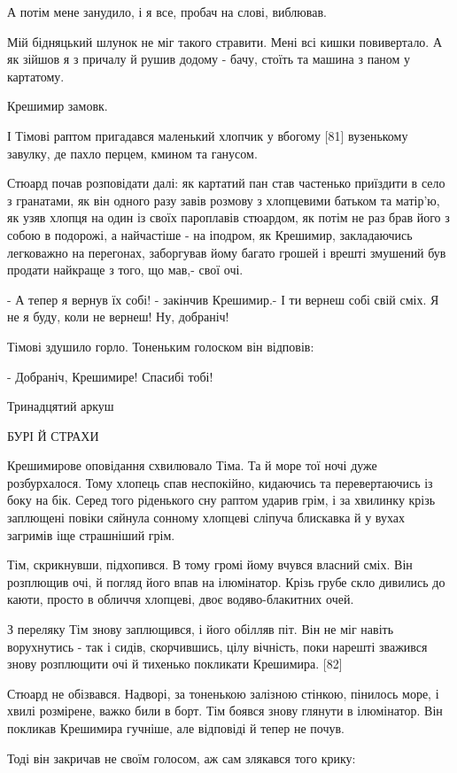 А потім мене занудило, і я все, пробач на слові, виблював.

Мій бідняцький шлунок не міг такого стравити. Мені всі кишки повивертало. А як зійшов я з причалу й рушив додому - бачу, стоїть та машина з паном у картатому.

Крешимир замовк.

І Тімові раптом пригадався маленький хлопчик у вбогому [81] вузенькому завулку, де пахло перцем, кмином та ганусом.

Стюард почав розповідати далі: як картатий пан став частенько приїздити в село з гранатами, як він одного разу завів розмову з хлопцевими батьком та матір'ю, як узяв хлопця на один із своїх пароплавів стюардом, як потім не раз брав його з собою в подорожі, а найчастіше - на іподром, як Крешимир, закладаючись легковажно на перегонах, заборгував йому багато грошей і врешті змушений був продати найкраще з того, що мав,- свої очі.

- А тепер я вернув їх собі! - закінчив Крешимир.- І ти вернеш собі свій сміх. Я не я буду, коли не вернеш! Ну, добраніч!

Тімові здушило горло. Тоненьким голоском він відповів:

- Добраніч, Крешимире! Спасибі тобі!

Тринадцятий аркуш

БУРІ Й СТРАХИ

Крешимирове оповідання схвилювало Тіма. Та й море тої ночі дуже розбурхалося. Тому хлопець спав неспокійно, кидаючись та перевертаючись із боку на бік. Серед того ріденького сну раптом ударив грім, і за хвилинку крізь заплющені повіки сяйнула сонному хлопцеві сліпуча блискавка й у вухах загримів іще страшніший грім.

Тім, скрикнувши, підхопився. В тому громі йому вчувся власний сміх. Він розплющив очі, й погляд його впав на ілюмінатор. Крізь грубе скло дивились до каюти, просто в обличчя хлопцеві, двоє водяво-блакитних очей.

З переляку Тім знову заплющився, і його обілляв піт. Він не міг навіть ворухнутись - так і сидів, скорчившись, цілу вічність, поки нарешті зважився знову розплющити очі й тихенько покликати Крешимира. [82]

Стюард не обізвався. Надворі, за тоненькою залізною стінкою, пінилось море, і хвилі розмірене, важко били в борт. Тім боявся знову глянути в ілюмінатор. Він покликав Крешимира гучніше, але відповіді й тепер не почув.

Тоді він закричав не своїм голосом, аж сам злякався того крику:

